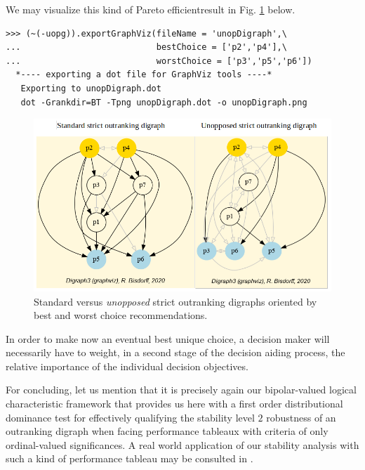 We may visualize this kind of Pareto efficientresult in Fig. \ref{fig:19.3} below.
\begin{lstlisting}
>>> (~(-uopg)).exportGraphViz(fileName = 'unopDigraph',\
...                           bestChoice = ['p2','p4'],\
...                           worstChoice = ['p3','p5','p6'])
  *---- exporting a dot file for GraphViz tools ----*
   Exporting to unopDigraph.dot
   dot -Grankdir=BT -Tpng unopDigraph.dot -o unopDigraph.png
\end{lstlisting}
\begin{figure}[h]
\includegraphics[width=12cm]{Figures/unopDigraph.png}
\caption{Standard versus \emph{unopposed} strict outranking digraphs oriented by best and worst choice recommendations.} 
\label{fig:19.3}       %
\end{figure}

In order to make now an eventual best unique choice, a decision maker will necessarily have to weight, in a second stage of the decision aiding process, the relative importance of the individual decision objectives.

\vspace{0.5cm}

For concluding, let us mention that it is precisely again our bipolar-valued logical characteristic framework that provides us here with a first order distributional dominance test for effectively qualifying the stability level $2$ robustness of an outranking digraph when facing performance tableaux with criteria of only ordinal-valued significances. A real world application of our stability analysis with such a kind of performance tableau may be consulted in \cite{BIS-2015p}.
 
